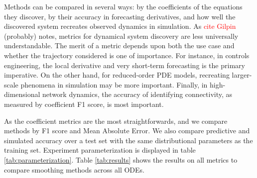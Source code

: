 \documentclass{article}
\newcommand{\red}[1]{\textcolor{red}{#1}}
\begin{document}
Methods can be compared in several ways: by the coefficients of the equations they discover, by their accuracy in forecasting derivatives, and how well the discovered system recreates observed dynamics in simulation.  As \red{cite Gilpin} (probably) notes,  metrics for dynamical system discovery are less universally understandable.  The merit of a metric depends upon both the use case and whether the trajectory considered is one of importance.  For instance, in controls engineering, the local derivative and very short-term forecasting is the primary imperative.  On the other hand, for reduced-order PDE models, recreating larger-scale phenomena in simulation may be more important.  Finally, in high-dimensional network dynamics, the accuracy of identifying connectivity, as measured by coefficient F1 score, is most important.

\begin{table}
    \label{tab:parameterization}
\end{table}
As the coefficient metrics are the most straightforwards, and we compare methods by F1 score and Mean Absolute Error.  We also compare predictive and simulated accuracy over a test set with the same distributional parameters as the training set.  Experiment parameterization is displayed in table \ref{tab:parameterization}.  Table \ref{tab:results} shows the results on all metrics to compare smoothing methods across all ODEs.
\begin{table}
    \label{tab:results}
\end{table}
\end{document}
